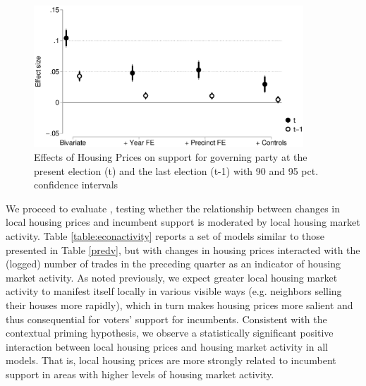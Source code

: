 \documentclass[12pt,a4paper]{article}
\begin{document}
	\begin{figure}[htbp!]
		\includegraphics[width=0.9\textwidth]{../figures/lagdv.eps}
		\centering
		\caption{Effects of Housing Prices on support for governing party at the present election (t) and the last election (t-1) with 90  and 95 pct. confidence intervals}\label{placebo}
	\end{figure}
	
	We proceed to evaluate \htwo, testing whether the relationship between changes in local housing prices and incumbent support is moderated by local housing market activity. Table \ref{table:econactivity} reports a set of models similar to those presented in Table \ref{predv}, but with changes in housing prices interacted with the (logged) number of trades in the preceding quarter as an indicator of housing market activity. As noted previously, we expect greater local housing market activity to manifest itself locally in various visible ways (e.g. neighbors selling their houses more rapidly), which in turn makes housing prices more salient and thus consequential for voters’ support for incumbents. Consistent with the contextual priming hypothesis, we observe a statistically significant positive interaction between local housing prices and housing market activity in all models. That is, local housing prices are more strongly related to incumbent support in areas with higher levels of housing market activity.
	
	
	
\end{document}
